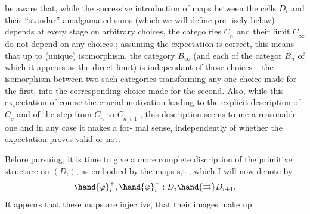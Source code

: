 be aware that, while the successive introduction of maps between the
cells $D_i$ and their ``standar'' amalgamated sums (which we will define pre-%
isely below) depends at every stage on arbitrary choices, the catego\hand{-}%
ries $\underline{C}_n$ and their limit $\underline{C}_\infty$ do not depend on any  choices ; assuming
the expectation is correct, this means that up to (unique) isomorphism,
the category $B_\infty$ (and each of the categor $B_n$ of which it appears as
the direct limit) is independant of those choices -- the isomorphism
between two such categories transforming any one choice made for the
first, into the corresponding choice made for the second. Also, while
this expectation  of course the crucial motivation leading to the
explicit description of $\underline{C}_o$ and of the  step from $\underline{C}_n$ to $\underline{C}_{n+1}$ , this
description seems to me a reasonable one and in any case it makes a for-%
mal sense,  independently of whether the expectation proves valid or not.

 Before pursuing, it is time to give a more complete discription
of the primitive structure on $(D_i)$, as embodied by the maps s,t ,
which I will now denote by
\[ \hand{\varphi}_i^{+} , \hand{\varphi}_i^{-} : D_i \hand{\rightrightarrows} D_{i+1} . \]
It appears that these maps are injective, that their images make up

